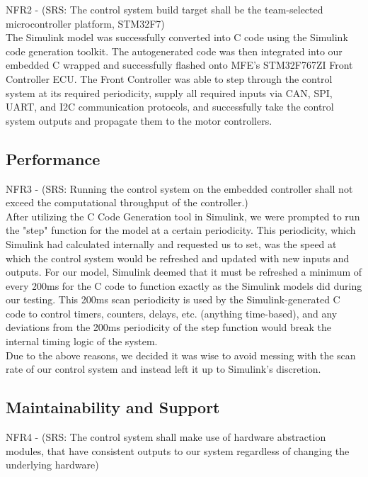 \documentclass[12pt, titlepage]{article}
\begin{document}
NFR2 - (SRS: The control system build target shall be the team-selected microcontroller
platform, STM32F7)\\

The Simulink model was successfully converted into C code using the Simulink code generation toolkit. The autogenerated code was then integrated into our embedded C wrapped and successfully flashed onto MFE's STM32F767ZI Front Controller ECU. The Front Controller was able to step through the control system at its required periodicity, supply all required inputs via CAN, SPI, UART, and I2C communication protocols, and successfully take the control system outputs and propagate them to the motor controllers.

\subsection{Performance}

NFR3 - (SRS: Running the control system on the embedded controller shall not exceed the
computational throughput of the controller.)\\

After utilizing the C Code Generation tool in Simulink, we were prompted to run the "step" function for the model at a certain periodicity. This periodicity, which Simulink had calculated internally and requested us to set, was the speed at which the control system would be refreshed and updated with new inputs and outputs. For our model, Simulink deemed that it must be refreshed a minimum of every 200ms for the C code to function exactly as the Simulink models did during our testing. This 200ms scan periodicity is used by the Simulink-generated C code to control timers, counters, delays, etc. (anything time-based), and any deviations from the 200ms periodicity of the step function would break the internal timing logic of the system. \\

Due to the above reasons, we decided it was wise to avoid messing with the scan rate of our control system and instead left it up to Simulink's discretion.

\subsection{Maintainability and Support}

NFR4 - (SRS: The control system shall make use of hardware abstraction modules, that have consistent outputs to our system regardless of changing the underlying hardware) \\
\end{document}
